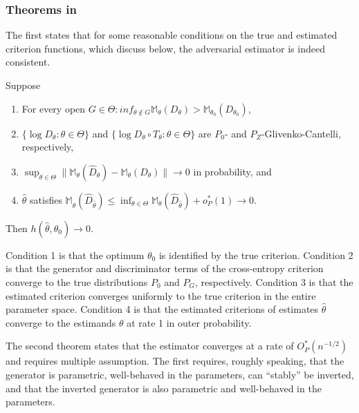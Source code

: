 \subsubsection{Theorems in \cite{kaji2023adversarial}}
\label{sec:theorems_paper}

The first states that for some reasonable conditions on the true and estimated criterion functions, which discuss below, the adversarial estimator is indeed consistent.

\begin{theorem}
    \label{th:kmp_1}
    Suppose
    \begin{enumerate}
        \item For every open $G \in \Theta : inf_{\theta \notin G} \mathbb{M}_{\theta}(D_{\theta}) > \mathbb{M}_{\theta_0}(D_{\theta_0})$,
        \item $\{ \log D_{\theta} : \theta \in \Theta \}$ and $\{ \log D_{\theta} \circ T_{\theta}: \theta \in \Theta \}$ are $P_0$- and $P_Z$-Glivenko-Cantelli, respectively,
        \item $\sup_{\theta \in \Theta} \| \mathbb{M}_{\theta}(\hat{D}_{\theta}) - \mathbb{M}_{\theta}(D_{\theta}) \| \rightarrow 0$ in probability, and
        \item $\hat{\theta}$ satisfies $\mathbb{M}_{\hat{\theta}}(\hat{D}_{\hat{\theta}}) \leq \inf_{\theta \in \Theta} \mathbb{M}_{\theta}(\hat{D}_{\hat{\theta}}) + o_P^{*}(1) \rightarrow 0$.
    \end{enumerate}
    Then $h(\hat{\theta}, \theta_0) \rightarrow 0$.
\end{theorem}

Condition 1 is that the optimum $\theta_0$ is identified by the true criterion.
Condition 2 is that the generator and discriminator terms of the cross-entropy criterion converge to the true distributions $P_0$ and $P_G$, respectively. %
Condition 3 is that the estimated criterion converges uniformly to the true criterion in the entire parameter space.
Condition 4 is that the estimated criterions of estimates $\hat{\theta}$ converge to the estimands $\theta$ at rate 1 in outer probability. %

The second theorem states that the estimator converges at a rate of $O^{*}_P(n^{-1/2})$ and requires multiple assumption.
The first requires, roughly speaking, that the generator is parametric, well-behaved in the parameters, can ``stably'' be inverted, and that the inverted generator is also parametric and well-behaved in the parameters. %

